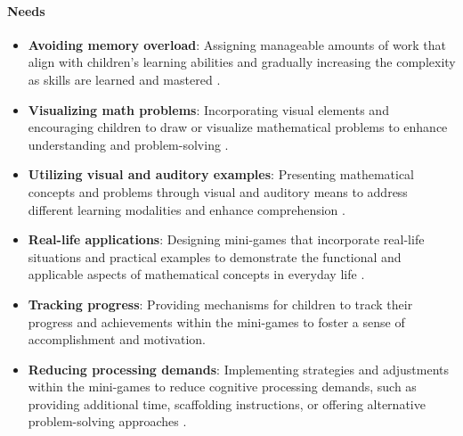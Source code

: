 \paragraph{Needs}
\begin{itemize}
    \item \textbf{Avoiding memory overload}: Assigning manageable amounts of work that align with children's learning abilities and gradually increasing the complexity as skills are learned and mastered \cite{clevelandclinic2024}.
    \item \textbf{Visualizing math problems}: Incorporating visual elements and encouraging children to draw or visualize mathematical problems to enhance understanding and problem-solving \cite{understood2024}.
    \item \textbf{Utilizing visual and auditory examples}: Presenting mathematical concepts and problems through visual and auditory means to address different learning modalities and enhance comprehension \cite{pmc2024}.
    \item \textbf{Real-life applications}: Designing mini-games that incorporate real-life situations and practical examples to demonstrate the functional and applicable aspects of mathematical concepts in everyday life \cite{understood2024}.
    \item \textbf{Tracking progress}: Providing mechanisms for children to track their progress and achievements within the mini-games to foster a sense of accomplishment and motivation.
    \item \textbf{Reducing processing demands}: Implementing strategies and adjustments within the mini-games to reduce cognitive processing demands, such as providing additional time, scaffolding instructions, or offering alternative problem-solving approaches \cite{understood2024}.
\end{itemize}
